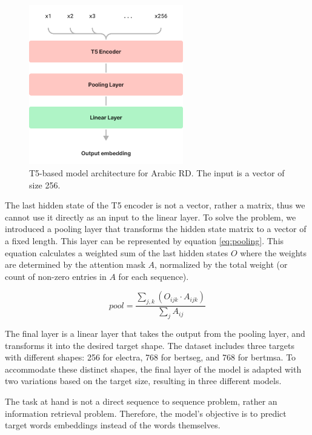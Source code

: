 \documentclass[12pt]{article}
\begin{document}
\begin{figure}
    \centering
    \captionsetup{justification=centering}
    \includegraphics[width=0.6\textwidth]{model-arch.png}
    \caption{T5-based model architecture for Arabic RD. The input is a vector of size 256.}
    \label{fig:model-arch}
\end{figure}

The last hidden state of the T5 encoder is not a vector, rather a matrix, thus we cannot use it directly as an input to the linear layer. To solve the problem, we introduced a pooling layer that transforms the hidden state matrix to a vector of a fixed length. This layer can be represented by equation \ref{eq:pooling}. This equation calculates a weighted sum of the last hidden states \(O\) where the weights are determined by the attention mask \(A\), normalized by the total weight (or count of non-zero entries in \(A\) for each sequence).

\begin{equation} \label{eq:pooling}
    pool = \frac{\sum_{j,k} (O_{ijk} \cdot A_{ijk})}{\sum_j A_{ij}}
\end{equation}

The final layer is a linear layer that takes the output from the pooling layer, and transforms it into the desired target shape. The dataset includes three targets with different shapes: 256 for electra, 768 for bertseg, and 768 for bertmsa. To accommodate these distinct shapes, the final layer of the model is adapted with two variations based on the target size, resulting in three different models.

The task at hand is not a direct sequence to sequence problem, rather an information retrieval problem. Therefore, the model's objective is to predict target words embeddings instead of the words themselves.
\end{document}
